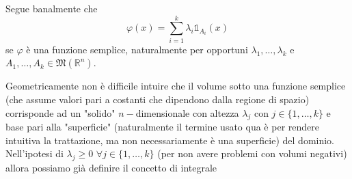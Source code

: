 \begin{remark}
Segue banalmente che
$$
\varphi(x) = \sum_{i=1}^k \lambda_i \mathbb{1}_{A_i} (x)
$$
se $\varphi$ è una funzione semplice, naturalmente per opportuni $\lambda_1, \ldots, \lambda_k$ e $A_1, \ldots, A_k \in \mathfrak{M}(\mathbb{R}^n)$.
\end{remark}
Geometricamente non è difficile intuire che il volume sotto una funzione semplice (che assume valori pari a costanti che dipendono dalla regione di spazio) corrisponde ad un "solido" $n-$dimensionale con altezza $\lambda_j$ con $j \in \{1, \ldots, k \}$ e base pari alla "superficie" (naturalmente il termine usato qua è per rendere intuitiva la trattazione, ma non necessariamente è una superficie) 
del dominio. Nell'ipotesi di $\lambda_j \geq 0 \, \, \forall j \in \{1, \ldots, k \}$ (per non avere problemi con volumi negativi) allora possiamo già definire il concetto di integrale

